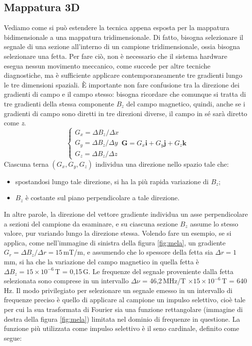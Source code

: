 \documentclass{report}
\newcommand{\figref}[1]{figura \ref{#1}}
\numberwithin{equation}{section}
\numberwithin{figure}{section}
\renewcommand{\Vec}{\bm}
\begin{document}
\subsection{Mappatura 3D}
Vediamo come si può estendere la tecnica appena esposta per la mappatura bidimensionale a una mappatura tridimensionale. Di fatto, bisogna selezionare il segnale di una sezione all'interno di un campione tridimensionale, ossia bisogna selezionare una fetta. Per fare ciò, non è necessario che il sistema hardware esegua nessun movimento meccanico, come succede per altre tecniche diagnostiche, ma è sufficiente applicare contemporaneamente tre gradienti lungo le tre dimensioni spaziali. È importante non fare confusione tra la direzione dei gradienti di campo e il campo stesso: bisogna ricordare che comunque si tratta di tre gradienti della stessa componente $B_z$ del campo magnetico, quindi, anche se i gradienti di campo sono diretti in tre direzioni diverse, il campo in sé sarà diretto come \textit{z}.
\begin{equation}\boxed{
    \begin{cases}
    G_x = \Delta B_z/\Delta x \\
    G_y = \Delta B_z/\Delta y \\
    G_z = \Delta B_z/\Delta z
    \end{cases}
    \Vec{G}=G_x\Vec{i}+G_y\Vec{j}+G_z\Vec{k}}
\end{equation}
Ciascuna terna $(G_x,G_y,G_z)$ individua una direzione nello spazio tale che:
\begin{itemize}[label=$-$]
    \item spostandosi lungo tale direzione, si ha la più rapida variazione di $B_z$;
    \item $B_z$ è costante sul piano perpendicolare a tale direzione.
\end{itemize}
In altre parole, la direzione del vettore gradiente individua un asse perpendicolare a sezioni del campione da esaminare, e su ciascuna sezione $B_z$ assume lo stesso valore, pur variando lungo la direzione stessa. Volendo fare un esempio, se si applica, come nell'immagine di sinistra della \figref{fig:mela}, un gradiente $G_r=\Delta B_z/\Delta r=15$\,mT/m, e assumendo che lo spessore della fetta sia $\Delta r=1$\,mm, si ha che la variazione del campo magnetico in quella fetta è $\Delta B_z=15\times10^{-6}$\,T = 0,15\,G. Le frequenze del segnale proveniente dalla fetta selezionata sono comprese in un intervallo $\Delta \nu$ = 46,2\,MHz/T $\times 15 \times 10^{-6}$\,T = 640\,Hz. Il modo privilegiato per selezionare un segnale emesso in un intervallo di frequenze preciso è quello di applicare al campione un impulso selettivo, cioè tale per cui la sua trasformata di Fourier sia una funzione rettangolare (immagine di destra della \figref{fig:mela}) limitata nel dominio di frequenze in questione. La funzione più utilizzata come impulso selettivo è il seno cardinale, definito come segue:
\end{document}
